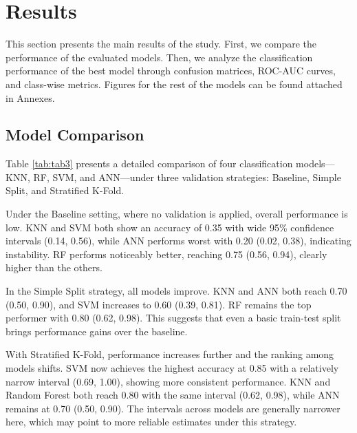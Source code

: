 \section{Results}

This section presents the main results of the study. First, we compare the
performance of the evaluated models. Then, we analyze the classification
performance of the best model  through confusion matrices, ROC-AUC curves, and
class-wise metrics. Figures for the rest of the models can be found attached in
Annexes.

\subsection{Model Comparison}

Table \ref{tab:tab3} presents a detailed comparison of four classification
models—KNN, RF, SVM, and ANN—under three validation strategies: Baseline,
Simple Split, and Stratified K-Fold.

Under the Baseline setting, where no validation is applied, overall performance
is low. KNN and SVM both show an accuracy of 0.35 with wide 95\% confidence
intervals (0.14, 0.56), while ANN performs worst with 0.20 (0.02, 0.38),
indicating instability. RF performs noticeably better, reaching 0.75 (0.56,
0.94), clearly higher than the others.

In the Simple Split strategy, all models improve. KNN and ANN both reach 0.70
(0.50, 0.90), and SVM increases to 0.60 (0.39, 0.81). RF remains the top
performer with 0.80 (0.62, 0.98). This suggests that even a basic train-test
split brings performance gains over the baseline.

With Stratified K-Fold, performance increases further and the ranking among
models shifts. SVM now achieves the highest accuracy at 0.85 with a relatively
narrow interval (0.69, 1.00), showing more consistent performance. KNN and
Random Forest both reach 0.80 with the same interval (0.62, 0.98), while ANN
remains at 0.70 (0.50, 0.90). The intervals across models are generally
narrower here, which may point to more reliable estimates under this strategy.


